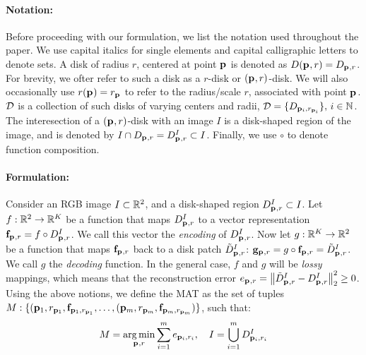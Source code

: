 \documentclass[10pt,twocolumn,letterpaper]{article}
\begin{document}
\paragraph{Notation:} Before proceeding with our formulation, we list the notation used throughout the paper.
We use capital italics for single elements and capital calligraphic letters to denote sets. A disk of radius $r$,
centered at point $\mathbf{p}_{}$ is denoted as $D(\mathbf{p}_{},r)=D_{\mathbf{p}_{},r}$. 
For brevity, we ofter refer to such a disk as a $r$-disk or $(\mathbf{p}_{},r)$-disk.
We will also occasionally use $r(\mathbf{p}_{}) = r_{\mathbf{p}_{}}$ to refer to the radius/scale $r$, associated with point $\mathbf{p}_{}$.
$\mathcal{D}$ is a collection of such disks of varying centers and radii, $\mathcal{D}=\{ D_{\mathbf{p}_{i},r_{\mathbf{p}_{i}}} \},\, i\in\mathbb{N}$.
The interesection of a $(\mathbf{p}_{},r)$-disk with an image $I$ is a disk-shaped region of the image, and is denoted by 
$I \cap D_{\mathbf{p}_{},r}=D_{\mathbf{p}_{},r}^I \subset I$. Finally, we use $\circ$ to denote function composition.

\paragraph{Formulation:} Consider an RGB image $I\subset\mathbb{R}^2$, and a disk-shaped region $D_{\mathbf{p}_{},r}^I \subset I$.
Let $f:\mathbb{R}^2 \rightarrow \mathbb{R}^K$ be a function that maps $D_{\mathbf{p}_{},r}^I$ to a vector representation $\mathbf{f}_{\mathbf{p}_{},r}=f\circ D_{\mathbf{p}_{},r}^I$. 
We call this vector the \emph{encoding} of $D_{\mathbf{p}_{},r}^I$. 
Now let $g:\mathbb{R}^K \rightarrow \mathbb{R}^2$ be a function that maps $\mathbf{f}_{\mathbf{p}_{},r}$ back to a disk patch $\tilde{D}_{\mathbf{p}_{},r}^I$: 
$\mathbf{g}_{\mathbf{p}_{},r} = g \circ \mathbf{f}_{\mathbf{p}_{},r} = \tilde{D}_{\mathbf{p}_{},r}^I$. We call $g$ the \emph{decoding} function.
In the general case, $f$ and $g$ will be \emph{lossy} mappings, which means that the reconstruction error 
$e_{\mathbf{p}_{},r} = \left \lVert  \tilde{D}_{\mathbf{p}_{},r}^I - D_{\mathbf{p}_{},r}^I \right \rVert_2^2 \geq 0$. 
Using the above notions, we define the MAT as the set of tuples 
$M:\{ ( \mathbf{p}_{1},r_{\mathbf{p}_{1}}, \mathbf{f}_{\mathbf{p}_{1},r_{\mathbf{p}_{1}}}, \ldots, ( \mathbf{p}_{m},r_{\mathbf{p}_{m}}, \mathbf{f}_{\mathbf{p}_{m},r_{\mathbf{p}_{m}}} ) \}$, such that:
\begin{equation}
M = \operatorname*{arg\,min}_{\mathbf{p}_{},r}{\sum_{i=1}^m e_{\mathbf{p}_{i},r_i}},\quad I=\bigcup_{i=1}^m D_{\mathbf{p}_{i},r_i}^I 
\label{eq:minimization}
\end{equation}
\end{document}
